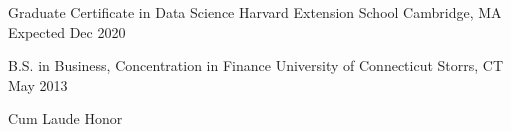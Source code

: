 

\begin{cventries}

  \cventry
    {Graduate Certificate in Data Science} %
    {Harvard Extension School} %
    {Cambridge, MA} %
    {Expected Dec 2020} %

    {B.S. in Business, Concentration in Finance} %
    {University of Connecticut} %
    {Storrs, CT} %
    {May 2013} %
    {
      \begin{cvitems} %
        \item {Cum Laude Honor}
      \end{cvitems}
    }

\end{cventries}
